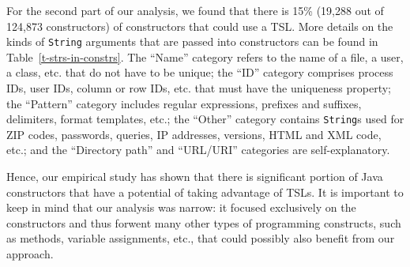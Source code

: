 For the second part of our analysis, we found that there is 15\% (19,288 out of 124,873 constructors) of constructors that could use a TSL. More details on the kinds of \lstinline{String} arguments that are passed into constructors can be found in Table~\ref{t-strs-in-constrs}. The ``Name'' category refers to the name of a file, a user, a class, etc. that do not have to be unique; the ``ID'' category comprises process IDs, user IDs, column or row IDs, etc. that must have the uniqueness property; the ``Pattern'' category includes regular expressions, prefixes and suffixes, delimiters, format templates, etc.; the ``Other'' category contains \lstinline{String}s used for ZIP codes, passwords, queries, IP addresses, versions, HTML and XML code, etc.; and the ``Directory path'' and ``URL/URI'' categories are self-explanatory.

Hence, our empirical study has shown that there is significant portion of Java constructors that have a potential of taking advantage of TSLs. It is important to keep in mind that our analysis was narrow: it focused exclusively on the constructors and thus forwent many other types of programming constructs, such as methods, variable assignments, etc., that could possibly also benefit from our approach.

